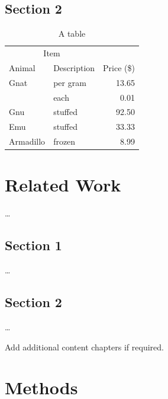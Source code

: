 \section{Section 2}
\label{ch:Foundations:sec:Section2}

\begin{table}[htb]
\centering
\begin{tabular}{llr}
\toprule
\multicolumn{2}{c}{Item} \\
\cmidrule(r){1-2}
Animal    & Description & Price (\$) \\
\midrule
Gnat      & per gram    & 13.65      \\
          & each        & 0.01       \\
Gnu       & stuffed     & 92.50      \\
Emu       & stuffed     & 33.33      \\
Armadillo & frozen      & 8.99       \\
\bottomrule
\end{tabular}
\caption{A table}
\end{table}



\chapter{Related Work}
\label{ch:RelatedWork}

\dots


\section{Section 1}
\label{ch:RelatedWork:sec:Section1}

\dots


\section{Section 2}
\label{ch:RelatedWork:sec:Section2}

\dots

Add additional content chapters if required. 


\chapter{Methods}
\label{ch:Methods}

